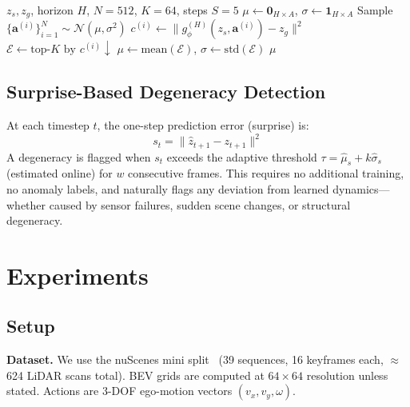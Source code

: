 \documentclass[10pt,twocolumn,letterpaper]{article}
\begin{document}
\begin{algorithm}[t]
\caption{CEM Latent Planning}
\label{alg:cem}
\begin{algorithmic}[1]
\REQUIRE $z_s, z_g$, horizon $H$, $N{=}512$, $K{=}64$, steps $S{=}5$
\STATE $\mu \leftarrow \mathbf{0}_{H \times A}$, $\sigma \leftarrow \mathbf{1}_{H \times A}$
  \STATE Sample $\{\mathbf{a}^{(i)}\}_{i=1}^N \sim \mathcal{N}(\mu, \sigma^2)$
  \STATE $c^{(i)} \leftarrow \|g_\phi^{(H)}(z_s, \mathbf{a}^{(i)}) - z_g\|^2$
  \STATE $\mathcal{E} \leftarrow \text{top-}K \text{ by } c^{(i)} \downarrow$
  \STATE $\mu \leftarrow \text{mean}(\mathcal{E})$, $\sigma \leftarrow \text{std}(\mathcal{E})$
\ENDFOR
\RETURN $\mu$
\end{algorithmic}
\end{algorithm}

\subsection{Surprise-Based Degeneracy Detection}

At each timestep $t$, the one-step prediction error (surprise) is:
\begin{equation}
  s_t = \|\hat{z}_{t+1} - z_{t+1}\|^2
  \label{eq:surprise}
\end{equation}
A degeneracy is flagged when $s_t$ exceeds the adaptive threshold
$\tau = \hat{\mu}_s + k\hat{\sigma}_s$ (estimated online) for $w$
consecutive frames. This requires no additional training, no anomaly
labels, and naturally flags any deviation from learned dynamics—whether
caused by sensor failures, sudden scene changes, or structural degeneracy.

\section{Experiments}
\label{sec:experiments}

\subsection{Setup}

\noindent\textbf{Dataset.}
We use the nuScenes mini split~\cite{caesar2020nuscenes}
(39 sequences, 16 keyframes each, $\approx$624 LiDAR scans total).
BEV grids are computed at $64{\times}64$ resolution unless stated.
Actions are 3-DOF ego-motion vectors $(v_x, v_y, \omega)$.
\end{document}
